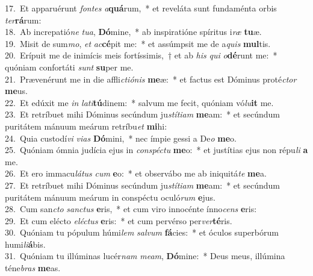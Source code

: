 {17.~}Et apparuérunt \textit{fon}\textit{tes} \textit{a}\textbf{quá}rum,~* et reveláta sunt fundaménta orbis \textit{ter}\textbf{rá}rum:\\
{18.~}Ab increpatió\textit{ne} \textit{tu}\textit{a}, \textbf{Dó}mine,~* ab inspiratióne spíritus i\textit{ræ} \textbf{tu}æ.\\
{19.~}Misit de sum\textit{mo}, \textit{et} \textit{ac}\textbf{cé}pit me:~* et assúmpsit me de a\textit{quis} \textbf{mul}tis.\\
{20.~}Erípuit me de inimícis meis fortíssimis,~† et ab \textit{his} \textit{qui} \textit{o}\textbf{dé}runt me:~* quóniam confortáti \textit{sunt} \textbf{su}per me.\\
{21.~}Prævenérunt me in die affli\textit{cti}\textit{ó}\textit{nis} \textbf{me}æ:~* et factus est Dóminus proté\textit{ctor} \textbf{me}us.\\
{22.~}Et edúxit me \textit{in} \textit{la}\textit{ti}\textbf{tú}dinem:~* salvum me fecit, quóniam vó\textit{lu}\textbf{it} me.\\
{23.~}Et retríbuet mihi Dóminus secúndum ju\textit{stí}\textit{ti}\textit{am} \textbf{me}am:~* et secúndum puritátem mánuum meárum retríbu\textit{et} \textbf{mi}hi:\\
{24.~}Quia custodí\textit{vi} \textit{vi}\textit{as} \textbf{Dó}mini,~* nec ímpie gessi a De\textit{o} \textbf{me}o.\\
{25.~}Quóniam ómnia judícia ejus in \textit{con}\textit{spé}\textit{ctu} \textbf{me}o:~* et justítias ejus non répu\textit{li} \textbf{a} me.\\
{26.~}Et ero immacu\textit{lá}\textit{tus} \textit{cum} \textbf{e}o:~* et observábo me ab iniquitá\textit{te} \textbf{me}a.\\
{27.~}Et retríbuet mihi Dóminus secúndum ju\textit{stí}\textit{ti}\textit{am} \textbf{me}am:~* et secúndum puritátem mánuum meárum in conspéctu oculó\textit{rum} \textbf{e}jus.\\
{28.~}Cum san\textit{cto} \textit{san}\textit{ctus} \textbf{e}ris,~* et cum viro innocénte ínno\textit{cens} \textbf{e}ris:\\
{29.~}Et cum elécto \textit{e}\textit{lé}\textit{ctus} \textbf{e}ris:~* et cum pervérso per\textit{ver}\textbf{té}ris.\\
{30.~}Quóniam tu pópulum húmi\textit{lem} \textit{sal}\textit{vum} \textbf{fá}cies:~* et óculos superbórum humi\textit{li}\textbf{á}bis.\\
{31.~}Quóniam tu illúminas lucér\textit{nam} \textit{me}\textit{am}, \textbf{Dó}mine:~* Deus meus, illúmina téne\textit{bras} \textbf{me}as.\\
